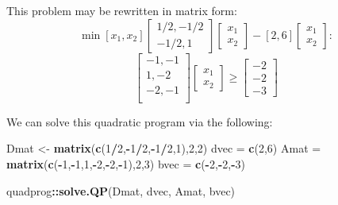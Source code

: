 \documentclass[11pt,]{article}
\newenvironment{Shaded}{\begin{snugshade}}{\end{snugshade}}
\newcommand{\KeywordTok}[1]{\textcolor[rgb]{0.13,0.29,0.53}{\textbf{#1}}}
\newcommand{\DecValTok}[1]{\textcolor[rgb]{0.00,0.00,0.81}{#1}}
\newcommand{\StringTok}[1]{\textcolor[rgb]{0.31,0.60,0.02}{#1}}
\newcommand{\OperatorTok}[1]{\textcolor[rgb]{0.81,0.36,0.00}{\textbf{#1}}}
\newcommand{\NormalTok}[1]{#1}
\begin{document}
This problem may be rewritten in matrix form:
\[\min{} [x_1,x_2]\begin{bmatrix}1/2,-1/2\\-1/2,1\end{bmatrix}
\begin{bmatrix}x_1\\x_2\end{bmatrix}-[2,6]\begin{bmatrix}x_1\\x_2\end{bmatrix}:\]
\[\begin{bmatrix}
-1, -1\\
1, -2\\
-2, -1\\
\end{bmatrix}
\begin{bmatrix}
x_1\\
x_2
\end{bmatrix}\geq
\begin{bmatrix}
-2\\
-2\\
-3
\end{bmatrix}\]

We can solve this quadratic program via the following:

\begin{Shaded}
\begin{Highlighting}[]
\NormalTok{Dmat <-}\StringTok{ }\KeywordTok{matrix}\NormalTok{(}\KeywordTok{c}\NormalTok{(}\DecValTok{1}\OperatorTok{/}\DecValTok{2}\NormalTok{,}\OperatorTok{-}\DecValTok{1}\OperatorTok{/}\DecValTok{2}\NormalTok{,}\OperatorTok{-}\DecValTok{1}\OperatorTok{/}\DecValTok{2}\NormalTok{,}\DecValTok{1}\NormalTok{),}\DecValTok{2}\NormalTok{,}\DecValTok{2}\NormalTok{)}
\NormalTok{dvec =}\StringTok{ }\KeywordTok{c}\NormalTok{(}\DecValTok{2}\NormalTok{,}\DecValTok{6}\NormalTok{)}
\NormalTok{Amat =}\StringTok{ }\KeywordTok{matrix}\NormalTok{(}\KeywordTok{c}\NormalTok{(}\OperatorTok{-}\DecValTok{1}\NormalTok{,}\OperatorTok{-}\DecValTok{1}\NormalTok{,}\DecValTok{1}\NormalTok{,}\OperatorTok{-}\DecValTok{2}\NormalTok{,}\OperatorTok{-}\DecValTok{2}\NormalTok{,}\OperatorTok{-}\DecValTok{1}\NormalTok{),}\DecValTok{2}\NormalTok{,}\DecValTok{3}\NormalTok{)}
\NormalTok{bvec =}\StringTok{ }\KeywordTok{c}\NormalTok{(}\OperatorTok{-}\DecValTok{2}\NormalTok{,}\OperatorTok{-}\DecValTok{2}\NormalTok{,}\OperatorTok{-}\DecValTok{3}\NormalTok{)}

\NormalTok{quadprog}\OperatorTok{::}\KeywordTok{solve.QP}\NormalTok{(Dmat, dvec, Amat, bvec)}
\end{Highlighting}
\end{Shaded}
\end{document}

